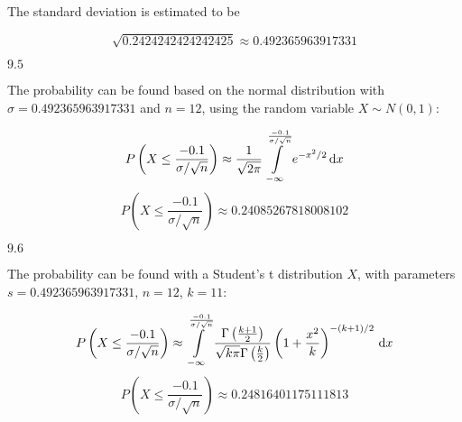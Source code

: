 \documentclass{article}
\newcommand{\problem}[2]{$\boxed{\text{#1.#2}}$}
\renewcommand{\d}[1]{\,\textnormal{d}#1}
\begin{document}
The standard deviation is estimated to be

\[
\sqrt{0.2424242424242425}\approx0.492365963917331
\]

\problem{9}{5}

The probability can be found based on the normal distribution with
$\sigma=0.492365963917331$ and $n=12$, using the random variable
$X\sim{}N(0,1)$:

\[
P\left(X \le \frac{-0.1}{\sigma/\sqrt{n}}\right)\approx
\frac{1}{\sqrt{2\pi}}\int\limits_{-\infty}^{\frac{-0.1}{\sigma/\sqrt{n}}} e^{-x^2/2}\d{x}
\] \[
P\left(X \le \frac{-0.1}{\sigma/\sqrt{n}}\right)\approx 0.24085267818008102
\]

\problem{9}{6}

The probability can be found with a Student's t distribution $X$, with
parameters $s=0.492365963917331$, $n=12$, $k=11$:

\[
P\left(X \le \frac{-0.1}{\sigma/\sqrt{n}}\right)\approx
\int\limits_{-\infty}^{\frac{-0.1}{\sigma/\sqrt{n}}}
\frac{\Gamma\left(\frac{k+1}{2}\right)}{\sqrt{k\pi}\Gamma\left(\frac{k}{2}\right)} \left(1+\frac{x^2}{k}\right)^{-(k+1)/2} \d{x}
\] \[
P\left(X \le \frac{-0.1}{\sigma/\sqrt{n}}\right)\approx0.24816401175111813
\]
\end{document}
